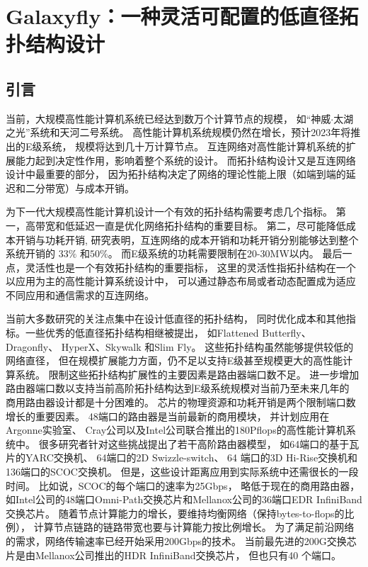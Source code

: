 \chapter{Galaxyfly：一种灵活可配置的低直径拓扑结构设计}

\section{引言}
当前，大规模高性能计算机系统已经达到数万个计算节点的规模，
如“神威$\cdot$太湖之光”系统和天河二号系统。
高性能计算机系统规模仍然在增长，预计2023年将推出的E级系统，
规模将达到几十万计算节点。
互连网络对高性能计算机系统的扩展能力起到决定性作用，影响着整个系统的设计。
而拓扑结构设计又是互连网络设计中最重要的部分，
因为拓扑结构决定了网络的理论性能上限（如端到端的延迟和二分带宽）与成本开销。

为下一代大规模高性能计算机设计一个有效的拓扑结构需要考虑几个指标。
第一，高带宽和低延迟一直是优化网络拓扑结构的重要目标。
第二，尽可能降低成本开销与功耗开销,
研究表明，互连网络的成本开销和功耗开销分别能够达到整个系统开销的
$33\%$ 和$50\%$。
而E级系统的功耗需要限制在20-30MW以内。
最后一点，灵活性也是一个有效拓扑结构的重要指标，
这里的灵活性指拓扑结构在一个以应用为主的高性能计算系统设计中，
可以通过静态布局或者动态配置成为适应不同应用和通信需求的互连网络。

当前大多数研究的关注点集中在设计低直径的拓扑结构，
同时优化成本和其他指标。一些优秀的低直径拓扑结构相继被提出，
如Flattened Butterfly、Dragonfly、
HyperX、Skywalk 和Slim Fly。
这些拓扑结构虽然能够提供较低的网络直径，
但在规模扩展能力方面，仍不足以支持E级甚至规模更大的高性能计算系统。
限制这些拓扑结构扩展性的主要因素是路由器端口数不足。
进一步增加路由器端口数以支持当前高阶拓扑结构达到E级系统规模对当前乃至未来几年的
商用路由器设计都是十分困难的。
芯片的物理资源和功耗开销是两个限制端口数增长的重要因素。
48端口的路由器是当前最新的商用模块，
并计划应用在Argonne实验室、
Cray公司以及Intel公司联合推出的180Pflops的高性能计算机系统中。
很多研究者针对这些挑战提出了若干高阶路由器模型，
如64端口的基于瓦片的YARC交换机、
64端口的2D Swizzle-switch、
64 端口的3D Hi-Rise交换机和136端口的SCOC交换机。
但是，这些设计距离应用到实际系统中还需很长的一段时间。
比如说，SCOC的每个端口的速率为25Gbps，
略低于现在的商用路由器，
如Intel公司的48端口Omni-Path交换芯片和Mellanox公司的36端口EDR InfiniBand交换芯片。
随着节点计算能力的增长，要维持均衡网络（保持bytes-to-flops的比例），
计算节点链路的链路带宽也要与计算能力按比例增长。
为了满足前沿网络的需求，网络传输速率已经开始采用200Gbps的技术。
当前最先进的200G交换芯片是由Mellanox公司推出的HDR InfiniBand交换芯片，
但也只有40 个端口。

